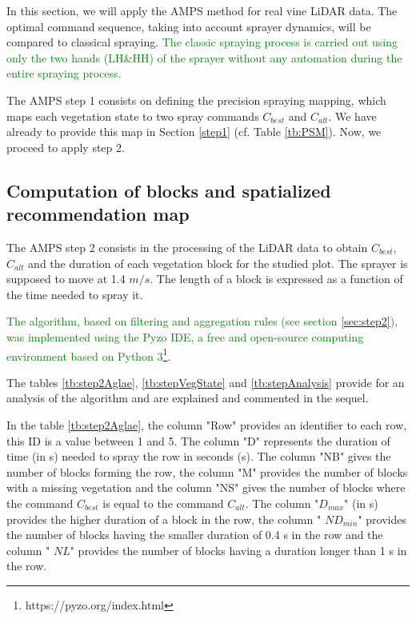 \documentclass[preprint,3p,times,twocolumn]{elsarticle}
\newcommand{\Rim}[1]{\textcolor{Green}{#1}}
\begin{document}
In this section, we will apply the AMPS method for real vine LiDAR data. The optimal command sequence, taking into account sprayer dynamics, will be compared to classical spraying. \Rim{The classic spraying process is carried out using only the two hands (LH\&HH) of the sprayer without any automation during the entire spraying process.}

The AMPS step 1 consists on defining the precision spraying mapping, which maps each vegetation state to two spray commands $C_{best}$ and $C_{alt}$. We have already to provide this map in Section \ref{step1} (cf. Table \ref{tb:PSM}). Now, we proceed to apply step 2.

\subsection{Computation of blocks and spatialized recommendation map}

The AMPS step 2 consists in the processing of the LiDAR data to obtain $C_{best}$, $C_{alt}$ and the duration of each vegetation block for the studied plot. The sprayer is supposed to move at 1.4 $m/s$. The length of a block is expressed as a function of the time needed to spray it. 

\Rim{The algorithm, based on filtering and aggregation rules (see section \ref{sec:step2}), was implemented using the Pyzo IDE, a free and open-source computing environment based on Python 3\footnote{{https://pyzo.org/index.html}}}. 

The tables \ref{tb:step2Aglae}, \ref{tb:stepVegState} and \ref{tb:stepAnalysis} provide for an analysis of the algorithm and are explained and commented in the sequel.

In the table \ref{tb:step2Aglae}, the column "Row" provides an identifier to each row, this ID is a value between 1 and 5. The column "D" represents the duration of time (in s) needed to spray the row in seconds (s). The column "NB" gives the number of blocks forming the row, the column "M" provides the number of blocks with a missing vegetation and the column "NS" gives the number of blocks where the command $C_{best}$ is equal to the command $C_{alt}$. The column "$D_{max}$" (in s) provides the higher duration of a block in the row, the column " $ND_{min}$" provides the number of blocks having the smaller duration of 0.4 s in the row and the column " $NL$" provides the number of blocks having a duration longer than 1 s in the row.
\end{document}
